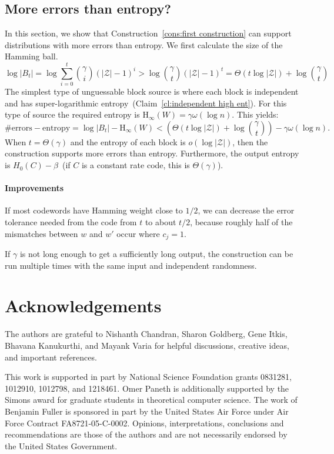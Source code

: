 \documentclass[11pt]{article}
\newcommand{\clref}[1]{\mbox{Claim~\ref{#1}}}
\newcommand{\consref}[1]{\mbox{Construction~\ref{#1}}}
\newcommand{\Hoo}{\mathrm{H}_\infty}
\newcommand{\blind}[1]{{#1}}
\newcommand{\blind}[1]{}
\begin{document}
\subsection{More errors than entropy?}
\label{sec:discussion}
In this section, we show that \consref{cons:first construction} can support distributions with more errors than entropy.
We first calculate the size of the Hamming ball.
\[
\log |B_t| = \log \sum_{i=0}^t {\gamma \choose i} (|\mathcal{Z}|-1)^i> \log {\gamma \choose t} (|\mathcal{Z}|-1)^t =\Theta(t\log |\mathcal{Z}|) + \log {\gamma\choose t}
\]
The simplest type of unguessable block source is where each block is independent and has super-logarithmic entropy~(\clref{cl:independent high ent}).  For this type of source the required entropy is $\Hoo(W) = \gamma\omega(\log n)$.  This yields:
\[
\text{\# errors} - \text{entropy} = \log |B_t| -  \Hoo(W)  <\left( \Theta(t\log |\mathcal{Z}|) + \log {\gamma \choose t}\right) -  \gamma \omega(\log n) .
\]
When $t =\Theta(\gamma)$ and the entropy of each block is $o(\log |\mathcal{Z}|)$, then the construction supports more errors than entropy. Furthermore, the output entropy is $H_0(C) -\beta$~(if $C$ is a constant rate code, this is $\Theta(\gamma)$).

\paragraph{Improvements}  If most codewords have Hamming weight close to $1/2$, we can decrease the error tolerance needed from the code from $t$ to  about $t/2$, because roughly half of the mismatches between $w$ and $w'$ occur where $c_j =1$.

If $\gamma$ is not long enough to get a sufficiently long output, the construction can be run multiple times with the same input and independent randomness.

\blind{
\section*{Acknowledgements}
The authors are grateful to Nishanth Chandran, Sharon Goldberg, Gene Itkis, Bhavana Kanukurthi, and Mayank Varia for helpful discussions, creative ideas, and important references.

This work is supported in part by National Science Foundation grants 0831281, 1012910, 1012798, and 1218461.
Omer Paneth is additionally supported by the Simons award for graduate students in theoretical computer science.
The work of Benjamin Fuller is sponsored in part by the United States Air Force under Air Force Contract FA8721-05-C-0002. Opinions, interpretations, conclusions and recommendations are those of the authors and are not necessarily endorsed by the United States Government.
}


\end{document}
